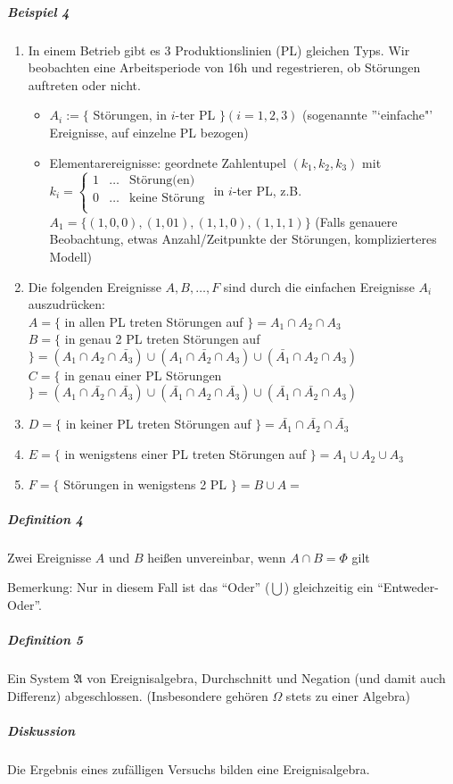 \documentclass[a4paper]{scrartcl}
\begin{document}
\subparagraph{Beispiel 4}
\begin{enumerate}
\item In einem Betrieb gibt es 3 Produktionslinien (PL) gleichen Typs. Wir beobachten eine Arbeitsperiode von 16h und regestrieren, ob Störungen auftreten oder nicht.
\begin{itemize}
\item $A_i := \{$ Störungen, in $i$-ter PL $\} (i = 1,2,3)$
(sogenannte ”`einfache"' Ereignisse, auf einzelne PL bezogen)
\item Elementarereignisse: geordnete Zahlentupel $(k_1,k_2,k_3)$ mit\\ $k_i = \left\{ \begin{array}{lcr} 1 & \dots & \text{Störung(en)} \\ 0 & \dots & \text{keine Störung} \\ \end{array} \right. $ in $i$-ter PL, z.B. $A_1 = \{ (1,0,0),(1,01),(1,1,0),(1,1,1)\}$ (Falls genauere Beobachtung, etwas Anzahl/Zeitpunkte der Störungen, komplizierteres Modell)
\end{itemize}
\item Die folgenden Ereignisse $A,B,\dots,F$ sind durch die einfachen Ereignisse $A_i$ auszudrücken:\\
$A=\{$ in allen PL treten Störungen auf $\} = A_1 \cap A_2 \cap A_3$\\
$B=\{$ in genau 2 PL treten Störungen auf$\} = (A_1 \cap A_2 \cap \bar{A_3}) \cup (A_1 \cap \bar{A_2} \cap A_3) \cup (\bar{A_1} \cap A_2 \cap A_3)$\\
$C=\{$ in genau einer PL Störungen $\} = (A_1 \cap \bar{A_2} \cap \bar{A_3} ) \cup (\bar{A_1} \cap A_2 \cap \bar{A_3} ) \cup (\bar{A_1} \cap \bar{A_2} \cap A_3)$
\item $D= \{$ in keiner PL treten Störungen auf $\} = \bar{A_1} \cap \bar{A_2} \cap \bar{A_3}$
\item $E = \{$ in wenigstens einer PL treten Störungen auf $\} = A_1 \cup A_2 \cup A_3$
\item $F= \{$ Störungen in wenigstens 2 PL $\} = B \cup A = $
\end{enumerate}
\subparagraph{Definition 4} Zwei Ereignisse $A$ und $B$ heißen unvereinbar, wenn $A \cap B = \Phi$ gilt

Bemerkung: Nur in diesem Fall ist das "`Oder"' ($\bigcup$) gleichzeitig ein "`Entweder-Oder"'.

\subparagraph{Definition 5} Ein System $\mathfrak{A}$ %
von Ereignisalgebra, Durchschnitt und Negation (und damit auch Differenz) abgeschlossen. (Insbesondere gehören $\Omega$ stets zu einer Algebra)
\subparagraph{Diskussion} Die Ergebnis eines zufälligen Versuchs bilden eine Ereignisalgebra.
\end{document}
